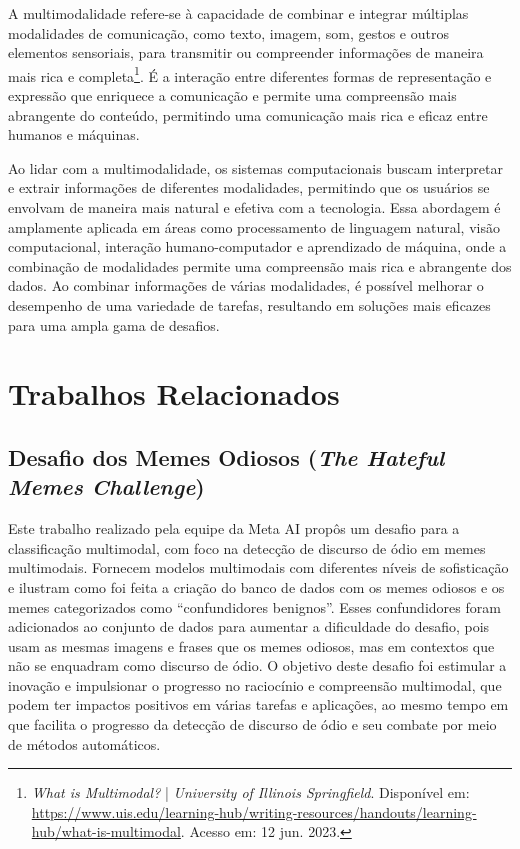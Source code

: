 A multimodalidade refere-se à capacidade de combinar e integrar múltiplas modalidades de comunicação, como texto, imagem, som, gestos e outros elementos sensoriais, para transmitir ou compreender informações de maneira mais rica e completa\footnote{\textit{What is Multimodal?} | \textit{University of Illinois Springfield}. Disponível em: \url{https://www.uis.edu/learning-hub/writing-resources/handouts/learning-hub/what-is-multimodal}. Acesso em: 12 jun. 2023.}. É a interação entre diferentes formas de representação e expressão que enriquece a comunicação e permite uma compreensão mais abrangente do conteúdo, permitindo uma comunicação mais rica e eficaz entre humanos e máquinas.

Ao lidar com a multimodalidade, os sistemas computacionais buscam interpretar e extrair informações de diferentes modalidades, permitindo que os usuários se envolvam de maneira mais natural e efetiva com a tecnologia. Essa abordagem é amplamente aplicada em áreas como processamento de linguagem natural, visão computacional, interação humano-computador e aprendizado de máquina, onde a combinação de modalidades permite uma compreensão mais rica e abrangente dos dados. Ao combinar informações de várias modalidades, é possível melhorar o desempenho de uma variedade de tarefas, resultando em soluções mais eficazes para uma ampla gama de desafios.

\section{Trabalhos Relacionados}

\subsection{Desafio dos Memes Odiosos (\textit{The Hateful Memes Challenge})} 

Este trabalho realizado pela equipe da Meta AI \cite{ArticleHatefulMemesChallenge2021} propôs um desafio para a classificação multimodal, com foco na detecção de discurso de ódio em memes multimodais. Fornecem modelos multimodais com diferentes níveis de sofisticação e ilustram como foi feita a criação do banco de dados com os memes odiosos e os memes categorizados como “confundidores benignos”. Esses confundidores foram adicionados ao conjunto de dados para aumentar a dificuldade do desafio, pois usam as mesmas imagens e frases que os memes odiosos, mas em contextos que não se enquadram como discurso de ódio. O objetivo deste desafio foi estimular a inovação e impulsionar o progresso no raciocínio e compreensão multimodal, que podem ter impactos positivos em várias tarefas e aplicações, ao mesmo tempo em que facilita o progresso da detecção de discurso de ódio e seu combate por meio de métodos automáticos.

